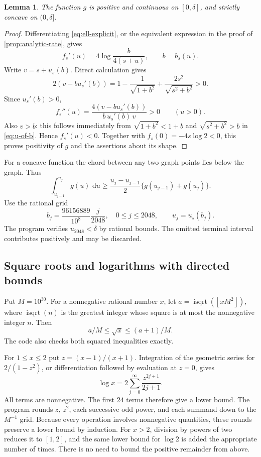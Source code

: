 \documentclass[11pt,letterpaper]{article}
\newtheorem{lemma}[lemma]{Lemma}
\theoremstyle{definition}
\newcommand{\dd}{\,\mathrm d}
\newcommand{\floor}[1]{\left\lfloor #1\right\rfloor}
\begin{document}
\begin{lemma}\label{lem:concavity}
The function $g$ is positive and continuous on $[0,\delta]$, and strictly
concave on $(0,\delta]$.
\end{lemma}
\begin{proof}
Differentiating \eqref{eq:ell-explicit}, or the equivalent expression in
the proof of \cref{prop:analytic-rate}, gives
\[
 f_s'(u)=4\log\frac{b}{4(s+u)},\qquad b=b_s(u).
\]
Write $v=s+u_s(b)$. Direct calculation gives
\[
 2(v-bu_s'(b))
 =1-\frac1{\sqrt{1+b^2}}+\frac{2s^2}{\sqrt{s^2+b^2}}>0.
\]
Since $u_s'(b)>0$,
\[
 f_s''(u)=\frac{4(v-bu_s'(b))}{b\,u_s'(b)\,v}>0
 \qquad(u>0).
\]
Also $v>b$: this follows immediately from
$\sqrt{1+b^2}<1+b$ and $\sqrt{s^2+b^2}>b$ in \eqref{eq:u-of-b}.
Hence $f_s'(u)<0$. Together with $f_s(0)=-4s\log2<0$, this proves
positivity of $g$ and the assertions about its shape.
\end{proof}

For a concave function the chord between any two graph points lies below
the graph. Thus
\begin{equation}\label{eq:trapezoid-lower}
 \int_{u_{j-1}}^{u_j}g(u)\,\dd u
 \ge\frac{u_j-u_{j-1}}2\{g(u_{j-1})+g(u_j)\}.
\end{equation}
Use the rational grid
\begin{equation}\label{eq:b-grid}
 b_j=\frac{96156889}{10^8}\frac{j}{2048},
 \quad 0\le j\le2048,\qquad u_j=u_s(b_j).
\end{equation}
The program verifies $u_{2048}<\delta$ by rational bounds. The omitted
terminal interval contributes positively and may be discarded.

\subsection{Square roots and logarithms with directed bounds}
Put $M=10^{30}$. For a nonnegative rational number $x$, let
$a=\operatorname{isqrt}(\floor{xM^2})$, where
$\operatorname{isqrt}(n)$ is the greatest integer whose square is at most
the nonnegative integer $n$. Then
\[
 a/M\le\sqrt x\le(a+1)/M.
\]
The code also checks both squared inequalities exactly.

For $1\le x\le2$ put $z=(x-1)/(x+1)$. Integration of the geometric series
for $2/(1-z^2)$, or differentiation followed by evaluation at $z=0$, gives
\[
 \log x=2\sum_{j=0}^\infty\frac{z^{2j+1}}{2j+1}.
\]
All terms are nonnegative. The first $24$ terms therefore give a lower
bound. The program rounds $z$, $z^2$, each successive odd power, and each
summand down to the $M^{-1}$ grid. Because every operation involves
nonnegative quantities, these rounds preserve a lower bound by induction.
For $x>2$, division by powers of two reduces it to $[1,2]$, and the same
lower bound for $\log2$ is added the appropriate number of times.
There is no need to bound the positive remainder from above.
\end{document}
